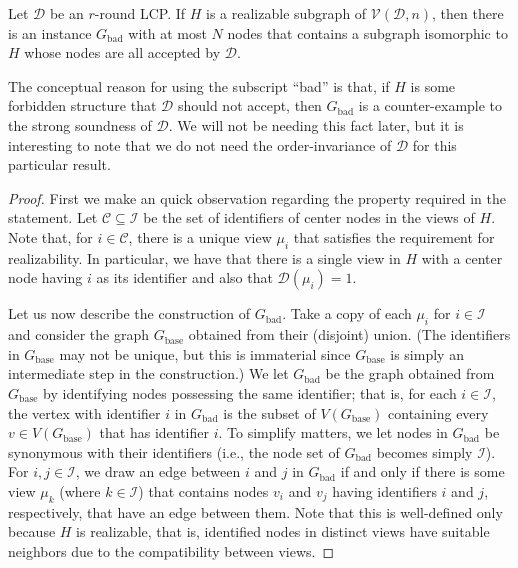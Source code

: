 \documentclass[11pt]{article}
\newcommand*{\alvgd}{\mathcal{V}(\mathcal{D},n)}
\newcommand*{\bad}{\mathrm{bad}}
\newcommand*{\base}{\mathrm{base}}
\begin{document}
\begin{lemma}
  \label{lem:realizable}
  Let $\mathcal{D}$ be an $r$-round LCP.
  If $H$ is a realizable subgraph of $\alvgd$, then there is an instance
  $G_\bad$ with at most $N$ nodes that contains a subgraph isomorphic to $H$
  whose nodes are all accepted by $\mathcal{D}$.
\end{lemma}

The conceptual reason for using the subscript \enquote{bad} is that, if $H$ is
some forbidden structure that $\mathcal{D}$ should not accept, then $G_\bad$ is
a counter-example to the strong soundness of $\mathcal{D}$.
We will not be needing this fact later, but it is interesting to note that we do
not need the order-invariance of $\mathcal{D}$ for this particular result.

\begin{proof}
  First we make an quick observation regarding the property required in the
  statement.
  Let $\mathcal{C} \subseteq \mathcal{I}$ be the set of identifiers of center
  nodes in the views of $H$.
  Note that, for $i \in \mathcal{C}$, there is a unique view $\mu_i$ that
  satisfies the requirement for realizability.
  In particular, we have that there is a single view in $H$ with a center node
  having $i$ as its identifier and also that $\mathcal{D}(\mu_i) = 1$.

  Let us now describe the construction of $G_\bad$.
  Take a copy of each $\mu_i$ for $i \in \mathcal{I}$ and consider the graph
  $G_\base$ obtained from their (disjoint) union.
  (The identifiers in $G_\base$ may not be unique, but this is immaterial since
  $G_\base$ is simply an intermediate step in the construction.)
  We let $G_\bad$ be the graph obtained from $G_\base$ by identifying nodes
  possessing the same identifier; that is, for each $i \in \mathcal{I}$, the
  vertex with identifier $i$ in $G_\bad$ is the subset of $V(G_\base)$
  containing every $v \in V(G_\base)$ that has identifier $i$.
  To simplify matters, we let nodes in $G_\bad$ be synonymous with their
  identifiers (i.e., the node set of $G_\bad$ becomes simply $\mathcal{I}$).
  For $i,j \in \mathcal{I}$, we draw an edge between $i$ and $j$ in $G_\bad$ if
  and only if there is some view $\mu_k$ (where $k \in \mathcal{I}$) that
  contains nodes $v_i$ and $v_j$ having identifiers $i$ and $j$, respectively,
  that have an edge between them.
  Note that this is well-defined only because $H$ is realizable, that is,
  identified nodes in distinct views have suitable neighbors due to the
  compatibility between views.


\end{proof}
\end{document}
